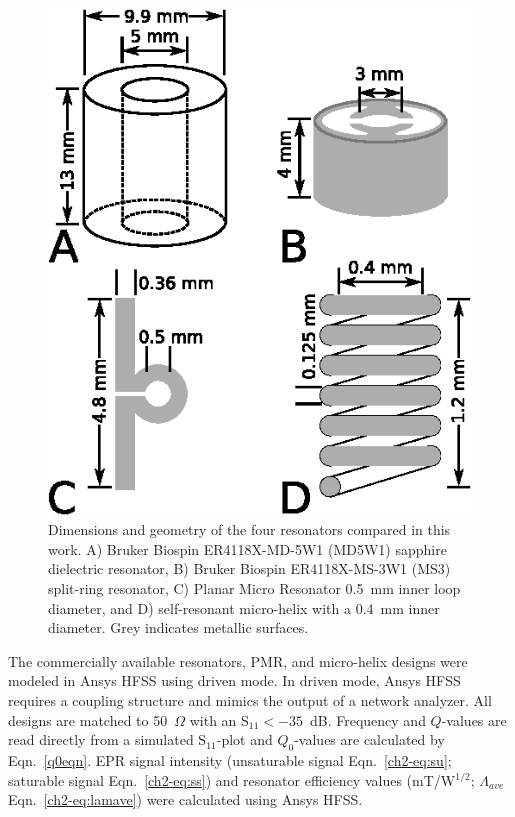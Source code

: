 \begin{figure}[htb]
\centering
 \includegraphics{Kapitel/Appendix/Images/S1-Geometries.eps}
 \caption[Geometries of resonators in this work.]{Dimensions and geometry of the four resonators compared in this work. A) Bruker Biospin ER4118X-MD-5W1 (MD5W1) sapphire dielectric resonator, B) Bruker Biospin ER4118X-MS-3W1 (MS3) split-ring resonator, C) Planar Micro Resonator 0.5~mm inner loop diameter, and D) self-resonant micro-helix with a 0.4~mm inner diameter. Grey indicates metallic surfaces.}
 \label{fig:geo}
\end{figure}

The commercially available resonators, PMR, and micro-helix designs were modeled in Ansys HFSS using driven mode. In driven mode, Ansys HFSS requires a coupling structure and mimics the output of a network analyzer. All designs are matched to 50~$\Omega$ with an S$_{11} < -35$~dB. Frequency and $Q$-values are read directly from a simulated S$_{11}$-plot and $Q_0$-values are calculated by Eqn.~\ref{q0eqn}. \cite{ginzton1957microwave} EPR signal intensity (unsaturable signal Eqn.~\ref{ch2-eq:su}; saturable signal Eqn.~\ref{ch2-eq:ss}) and resonator efficiency values (mT/W$^{1/2}$; $\Lambda_{ave}$ Eqn.~\ref{ch2-eq:lamave}) were calculated using Ansys HFSS.\cite{misrabook}  

